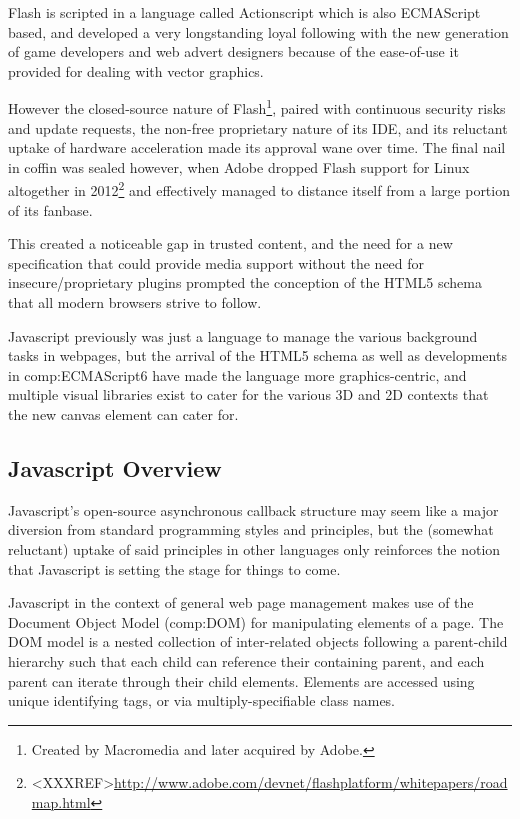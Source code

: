 Flash is scripted in a language called Actionscript which is also ECMAScript based, and developed a very longstanding loyal following with the new generation of game developers and web advert designers because of the ease-of-use it provided for dealing with vector graphics.

However the closed-source nature of Flash\footnote{Created by Macromedia and later acquired by Adobe.}, paired with continuous security risks and update requests, the non-free proprietary nature of its IDE, and its reluctant uptake of hardware acceleration made its approval wane over time. The final nail in coffin was sealed however, when Adobe dropped Flash support for Linux altogether in 2012\footnote{<XXXREF>\url{http://www.adobe.com/devnet/flashplatform/whitepapers/roadmap.html}} and effectively managed to distance itself from a large portion of its fanbase. 

This created a noticeable gap in trusted content, and the need for a new specification that could provide media support without the need for insecure/proprietary plugins prompted the conception of the HTML5 schema that all modern browsers strive to follow.

Javascript previously was just a language to manage the various background tasks in webpages, but the arrival of the HTML5 schema as well as developments in \gls{comp:ECMAScript6} have made the language more graphics-centric, and multiple visual libraries exist to cater for the various 3D and 2D contexts that the new canvas element can cater for\citep{ecmascript2011ecmascript}. 


\subsection{Javascript Overview}\label{ref:haplo:javaover}

Javascript's open-source asynchronous callback structure may seem like a major diversion from standard programming styles and principles, but the (somewhat reluctant) uptake of said principles in other languages only reinforces the notion that Javascript is setting the stage for things to come.

Javascript in the context of general web page management makes use of the Document Object Model (\gls{comp:DOM}) for manipulating elements of a page. The DOM model is a nested collection of inter-related objects following a parent-child hierarchy such that each child can reference their containing parent, and each parent can iterate through their child elements. Elements are accessed using unique identifying tags, or via multiply-specifiable class names.

